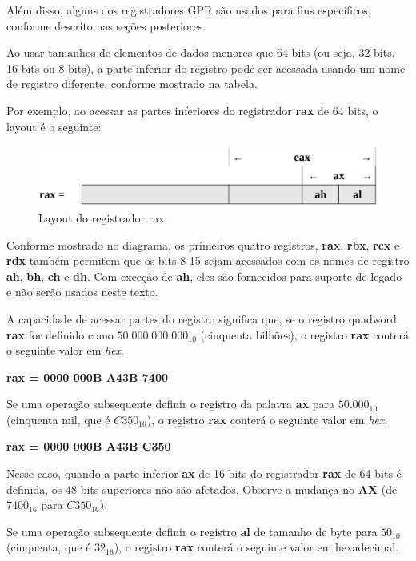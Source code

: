 Além disso, alguns dos registradores GPR são usados para fins específicos, conforme descrito nas seções posteriores.

Ao usar tamanhos de elementos de dados menores que 64 bits (ou seja, 32 bits, 16 bits ou 8 bits), a parte inferior do registro pode ser acessada usando um nome de registro diferente, conforme mostrado na tabela.

Por exemplo, ao acessar as partes inferiores do registrador \textbf{rax} de 64 bits, o layout é o seguinte:

\begin{figure}[ht]
	\includegraphics[width=0.8\linewidth]{imagens/layoutrax}
	\caption{Layout do registrador rax.}
	\label{layoutrax}
\end{figure}

Conforme mostrado no diagrama, os primeiros quatro registros, \textbf{rax}, \textbf{rbx}, \textbf{rcx} e \textbf{rdx} também permitem que os bits 8-15 sejam acessados com os nomes de registro \textbf{ah}, \textbf{bh}, \textbf{ch} e \textbf{dh}. Com exceção de \textbf{ah}, eles são fornecidos para suporte de legado e não serão usados neste texto.

A capacidade de acessar partes do registro significa que, se o registro quadword \textbf{rax}  for definido como $ 50.000.000.000_{10} $ (cinquenta bilhões), o registro \textbf{rax} conterá o seguinte valor em \textit{hex}.

\begin{center}
	\textbf{rax = 0000 000B A43B 7400}
\end{center}

Se uma operação subsequente definir o registro da palavra \textbf{ax} para $ 50.000_{10} $ (cinquenta mil, que é $ C350_{16} $), o registro \textbf{rax} conterá o seguinte valor em \textit{hex}.

\begin{center}
	\textbf{rax = 0000 000B A43B C350}
\end{center}

Nesse caso, quando a parte inferior \textbf{ax} de 16 bits do registrador \textbf{rax} de 64 bits é definida, os 48 bits superiores não são afetados. Observe a mudança no \textbf{AX} (de $ 7400_{16} $ para $ C350_{16} $).

Se uma operação subsequente definir o registro \textbf{al} de tamanho de byte para $ 50_{10} $ (cinquenta, que é $ 32_{16} $), o registro \textbf{rax} conterá o seguinte valor em hexadecimal.

